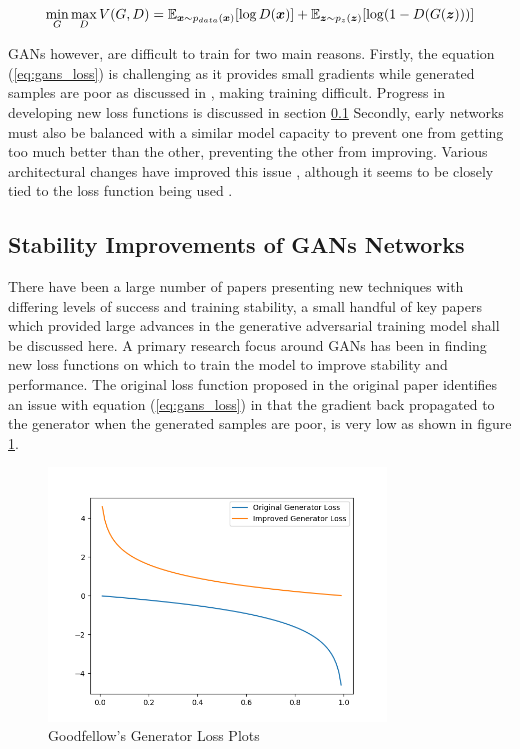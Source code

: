 \begin{equation} \label{eq:gans_loss}
    \min_{G} \max_{D} V(G, D) = \mathbb{E}_{{\boldsymbol{{x}}} \sim p_{data}({\boldsymbol{{x}}})} [\log D({\boldsymbol{{x}}})]
                              + \mathbb{E}_{{\boldsymbol{{z}}} \sim p_{z}({\boldsymbol{{z}}})} [\log (1 - D(G({\boldsymbol{{z}}})))]
\end{equation}
\quad

GANs however, are difficult to train for two main reasons.
Firstly, the equation (\ref{eq:gans_loss}) is challenging as it provides small gradients while generated samples are poor as discussed in \cite{Goodfellow2014}, making training difficult.
Progress in developing new loss functions is discussed in section \ref{Stability_to_GANs}
Secondly, early networks must also be balanced with a similar model capacity to prevent one from getting too much better than the other, preventing the other from improving.
Various architectural changes have improved this issue \cite{Radford2016, Zhang2018}, although it seems to be closely tied to the loss function being used \cite{Gulrajani2017}.

\subsection{Stability Improvements of GANs Networks} \label{Stability_to_GANs}
There have been a large number of papers presenting new techniques with differing levels of success and training stability, a small handful of key papers which provided large advances in the generative adversarial training model shall be discussed here.
A primary research focus around GANs has been in finding new loss functions on which to train the model to improve stability and performance.
The original loss function proposed in the original paper \cite{Goodfellow2014} identifies an issue with equation (\ref{eq:gans_loss}) in that the gradient back propagated to the generator when the generated samples are poor, is very low as shown in figure \ref{fig:Goodfellow_plot}.

\begin{figure}[h]
    \centering
        \includegraphics[width=0.8\textwidth]{figures/goodfellow_gen_losses.png}
    \caption{Goodfellow's Generator Loss Plots \cite{Goodfellow2014}}\label{fig:Goodfellow_plot}
\end{figure}
\quad

